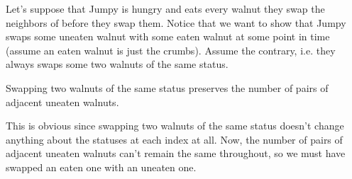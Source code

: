 \documentclass[11pt]{scrartcl}
\begin{document}
\begin{soln}
  Let's suppose that Jumpy is hungry and eats every walnut they swap the neighbors of before they swap them. Notice that we want to show that
  Jumpy swaps some uneaten walnut with some eaten walnut at some point in time (assume an eaten walnut is just the crumbs).
  Assume the contrary, i.e. they always swaps some two walnuts of the same status.
  \begin{lemma}
    Swapping two walnuts of the same status preserves the number of pairs of adjacent uneaten walnuts.
  \end{lemma}
  This is obvious since swapping two walnuts of the same status doesn't change anything about the statuses at each index at all.
  \newline \newline
  Now, the number of pairs of adjacent uneaten walnuts can't remain the same throughout, so we must have swapped an eaten one with an uneaten one.
\end{soln}
\end{document}
